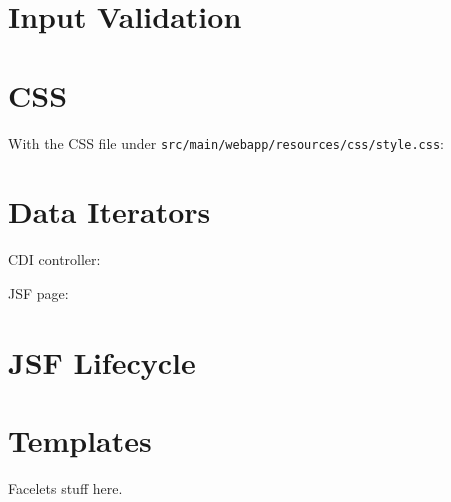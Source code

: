 

\section{Input Validation}



\section{CSS}



With the CSS file under \texttt{src/main/webapp/resources/css/style.css}:




\section{Data Iterators}

CDI controller:


JSF page:



\section{JSF Lifecycle}


\section{Templates}

Facelets stuff here.